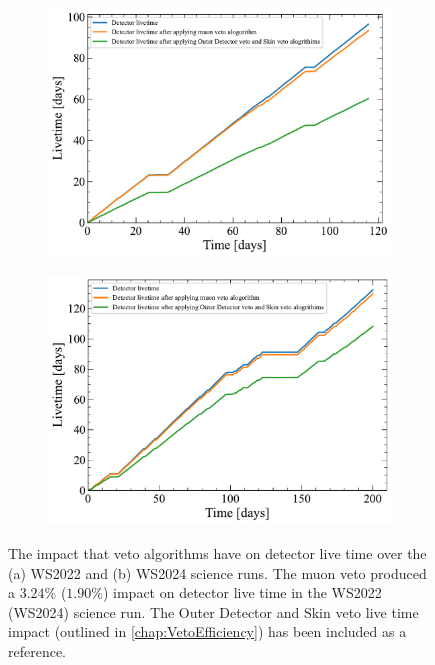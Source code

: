 \begin{figure}[ht!]
\centering
\begin{subfigure}{0.47\textwidth}
    \includegraphics[width=\textwidth]{figures/Muons/SR1WSAnalysis_SR1-WSv5_LZAP-5.4.6_v36_run_time_comparison.pdf}
    \caption{}
    \label{fig:WS2022_MuonVetoLivetimeImpact}
\end{subfigure}
\hfill
\begin{subfigure}{0.47\textwidth}
    \includegraphics[width=\textwidth]{figures/Muons/SR3-WSv5_LZAP-5.4.6_run_time_comparison.pdf}
    \caption{}
    \label{fig:WS2024_MuonVetoLivetimeImpact}
\end{subfigure}
\caption{The impact that veto algorithms have on detector live time over the (a) WS2022 and (b) WS2024 science runs. The muon veto produced a $3.24\%$ ($1.90\%$) impact on detector live time in the WS2022 (WS2024) science run. The Outer Detector and Skin veto live time impact (outlined in \autoref{chap:VetoEfficiency}) has been included as a reference.}
\label{fig:MuonVetoLivetimeImpact}
\end{figure}